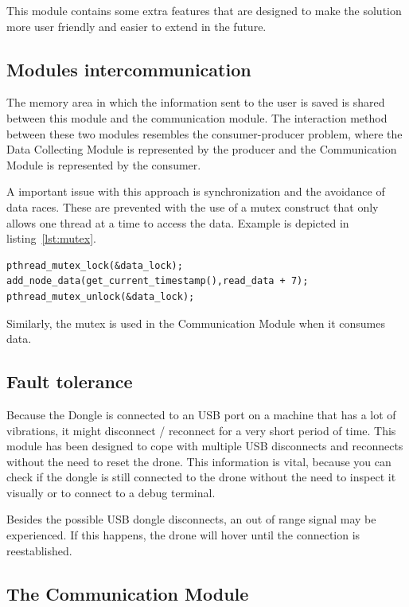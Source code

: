 This module contains some extra features that are designed to make the solution more user friendly and easier to extend in the future.

\subsection{Modules intercommunication}

The memory area in which the information sent to the user is saved is shared between this module and the communication module. The interaction method between these two modules resembles the consumer-producer problem, where the Data Collecting Module is represented by the producer and the Communication Module is represented by the consumer.

A important issue with this approach is synchronization and the avoidance of data races. These are prevented with the use of a mutex construct that only allows one thread at a time to access the data. Example is depicted in listing~\ref{lst:mutex}.

\lstset{numbers=none, mathescape=true, nolol=false,caption=Data Collection use of mutex,label=lst:mutex}
\begin{lstlisting}
pthread_mutex_lock(&data_lock);
add_node_data(get_current_timestamp(),read_data + 7);
pthread_mutex_unlock(&data_lock);
\end{lstlisting}

Similarly, the mutex is used in the Communication Module when it consumes data.


\subsection{Fault tolerance}

Because the Dongle is connected to an USB port on a machine that has a lot of vibrations, it might disconnect / reconnect for a very short period of time. This module has been designed to cope with multiple USB disconnects and reconnects without the need to reset the drone. This information is vital, because you can check if the dongle is still connected to the drone without the need to inspect it visually or to connect to a debug terminal.

Besides the possible USB dongle disconnects, an out of range signal may be experienced. If this happens, the drone will hover until the connection is reestablished.

\subsection{The Communication Module}


